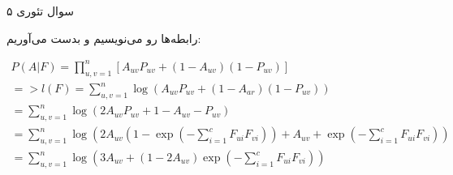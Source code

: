 سوال تئوری ۵

رابطه‌ها رو می‌نویسیم و بدست می‌آوریم:

$$
\begin{aligned}P\left( A| F\right) =\prod ^{n}_{u,v=1}\left[ A_{uv}P_{uv}+\left( 1-A_{uv}\right) \left( 1-P_{uv}\right) \right]  \\ = > l\left( F\right) =\sum ^{n}_{u,v=1}\log \left( A_{uv}P_{uv}+\left( 1-A_{ar}\right) \left( 1-P_{uv}\right) \right) \\ =\sum ^{n}_{u,v=1}\log \left( 2A_{uv}P_{uv}+1-A_{uv}-P_{uv}\right) \\ =\sum ^{n}_{u,v=1}\log \left( 2A_{uv}\left( 1-\exp \left( -\sum ^{c}_{i=1}F_{ui}F_{vi}\right) \right) +A_{uv}+\exp \left( -\sum ^{c}_{i=1}F_{ui}F_{vi}\right) \right) \\ =\sum ^{n}_{u,v=1}\log \left( 3A_{uv}+\left( 1-2A_{uv}\right) \exp \left( -\sum ^{c}_{i=1}F_{ui}F_{vi}\right) \right) \end{aligned}
$$
